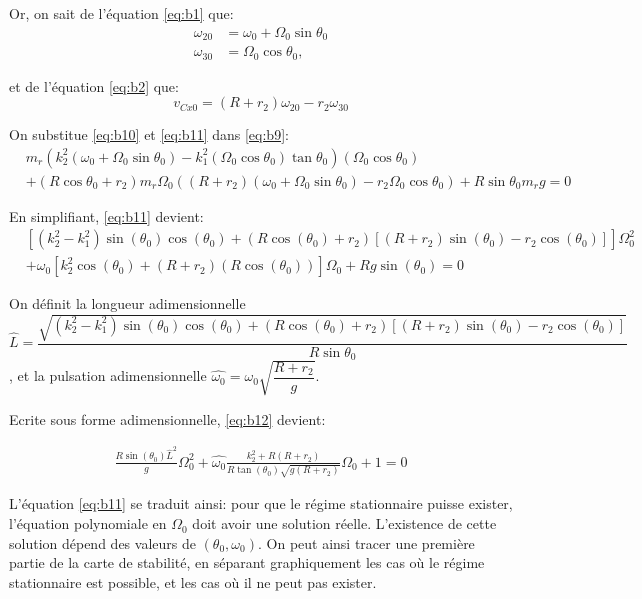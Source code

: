 Or, on sait de l'équation \ref{eq:b1} que:
\begin{align}
    \omega_{20}&=\omega_0 + \Omega_0 \sin{\theta_0} \nonumber\\
    \omega_{30}&=\Omega_0 \cos{\theta_0},
  \label{eq:b10}
\end{align}

et de l'équation \ref{eq:b2} que:
\begin{equation}
    v_{Cx0}=(R+r_2)\omega_{20}-r_2\omega_{30}
    \label{eq:b10b}
\end{equation}

On substitue \ref{eq:b10} et \ref{eq:b11} dans \ref{eq:b9}:
\begin{align}
     &m_r(k_2^2(\omega_0 + \Omega_0 \sin{\theta_0})-k_1^2(\Omega_0 \cos{\theta_0}) \tan{\theta_0})(\Omega_0 \cos{\theta_0})  \nonumber\\
    &+(R\cos{\theta_0}+r_2)m_r \Omega_0 ((R+r_2)(\omega_0 + \Omega_0 \sin{\theta_0})-r_2\Omega_0 \cos{\theta_0}) + R\sin{\theta_0}m_r g =0
  \label{eq:b11}
\end{align}

En simplifiant, \ref{eq:b11} devient:
\begin{align}
     &[(k_2^2-k_1^2)\sin(\theta_0)\cos(\theta_0)+(R \cos(\theta_0)+r_2)[(R+r_2)\sin(\theta_0)-r_2 \cos(\theta_0)]]\Omega_0^2 \nonumber\\
     &+\omega_0[k_2^2 \cos(\theta_0)+(R+r_2)(R \cos(\theta_0))] \Omega_0 + R g \sin(\theta_0) =0
  \label{eq:b12}
\end{align}

On définit la longueur adimensionnelle $$\hat{L}=\dfrac{\sqrt{(k_2^2-k_1^2)\sin(\theta_0)\cos(\theta_0)+(R \cos(\theta_0)+r_2)[(R+r_2)\sin(\theta_0)-r_2 \cos(\theta_0)]}}{R\sin{\theta_0}}$$,
et la pulsation adimensionnelle $\hat{\omega_0}=\omega_0 \sqrt{\dfrac{R+r_2}{g}}$.

Ecrite sous forme adimensionnelle, \ref{eq:b12} devient:

\begin{equation}
 \begin{split}
     \frac{R \sin(\theta_0)\hat{L}^2}{g} \Omega_0^2+\hat{\omega_0} \frac{k_2^2+R(R+r_2)}{R \tan(\theta_0) \sqrt{g(R+r_2)}} \Omega_0+1 =0
 \end{split}
  \label{eq:b12a}
\end{equation}

L'équation \ref{eq:b11} se traduit ainsi: pour que le régime stationnaire puisse exister, l'équation polynomiale en $\Omega_0$ doit avoir une solution réelle. L'existence de cette solution dépend des valeurs de $(\theta_0,\omega_0)$. On peut ainsi tracer une première partie de la carte de stabilité, en séparant graphiquement les cas où le régime stationnaire est possible, et les cas où il ne peut pas exister.


